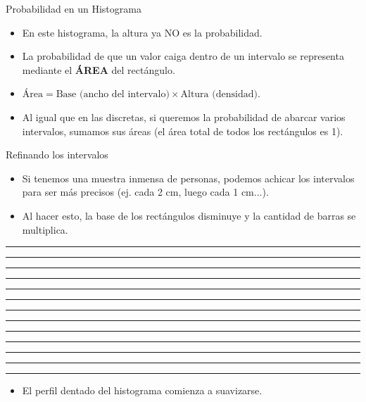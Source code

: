 \documentclass[11pt, aspectratio=169]{beamer}
\begin{document}
\begin{frame}{Probabilidad en un Histograma}
    \begin{itemize}
        \item En este histograma, la altura ya NO es la probabilidad.
        \item La probabilidad de que un valor caiga dentro de un intervalo se representa mediante el \textbf{ÁREA} del rectángulo.
        \item $\text{Área} = \text{Base (ancho del intervalo)} \times \text{Altura (densidad)}$.
        \item Al igual que en las discretas, si queremos la probabilidad de abarcar varios intervalos, sumamos sus áreas (el área total de todos los rectángulos es 1).
    \end{itemize}
\end{frame}

\begin{frame}{Refinando los intervalos}
    \begin{itemize}
        \item Si tenemos una muestra inmensa de personas, podemos achicar los intervalos para ser más precisos (ej. cada 2 cm, luego cada 1 cm...).
        \item Al hacer esto, la base de los rectángulos disminuye y la cantidad de barras se multiplica.
    \end{itemize}
    \vspace{0.5cm}
    
    \begin{center}
        \textcolor{cyan}{\rule{0.3cm}{0.2cm}}\textcolor{cyan}{\rule{0.3cm}{0.5cm}}\textcolor{cyan}{\rule{0.3cm}{0.9cm}}\textcolor{cyan}{\rule{0.3cm}{1.4cm}}\textcolor{cyan}{\rule{0.3cm}{2.0cm}}\textcolor{cyan}{\rule{0.3cm}{2.5cm}}\textcolor{cyan}{\rule{0.3cm}{2.8cm}}\textcolor{cyan}{\rule{0.3cm}{2.5cm}}\textcolor{cyan}{\rule{0.3cm}{2.0cm}}\textcolor{cyan}{\rule{0.3cm}{1.4cm}}\textcolor{cyan}{\rule{0.3cm}{0.9cm}}\textcolor{cyan}{\rule{0.3cm}{0.5cm}}\textcolor{cyan}{\rule{0.3cm}{0.2cm}}
    \end{center}
    
    \begin{itemize}
        \item El perfil dentado del histograma comienza a suavizarse.
    \end{itemize}
\end{frame}
\end{document}
